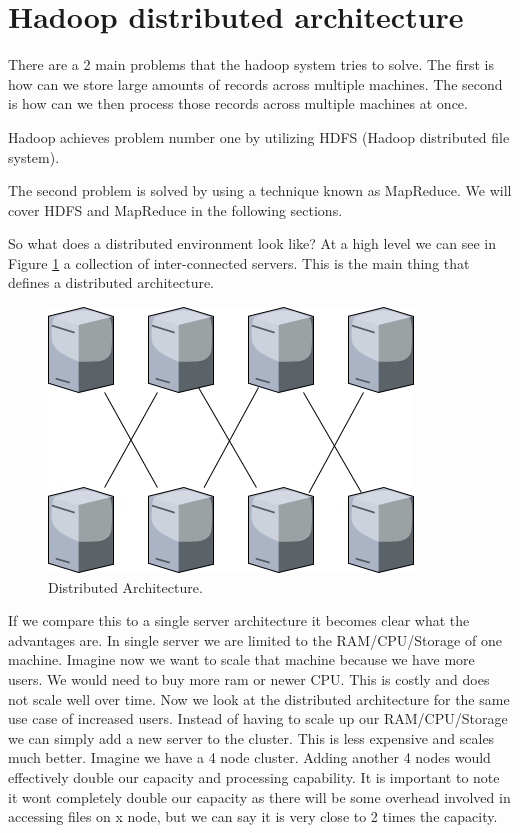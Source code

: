 \section{Hadoop distributed architecture}

There are a 2 main problems that the hadoop system tries to solve. 
The first is how can we store large amounts of records across multiple machines.
The second is how can we then process those records across multiple machines at once.

Hadoop achieves problem number one by utilizing HDFS (Hadoop distributed file system). 

The second problem is solved by using a technique known as MapReduce.
We will cover HDFS and MapReduce in the following sections. 

So what does a distributed environment look like? At a high level we can see in Figure \ref{fig:distributed} a collection of inter-connected servers. This is the main thing that defines a distributed architecture. 

\begin{figure}[h!]
  \includegraphics[width=\linewidth]{./images/distributed.png}
  \caption{Distributed Architecture.}
  \label{fig:distributed}
\end{figure}

If we compare this to a single server architecture it becomes clear what the advantages are. In single server we are limited to the RAM/CPU/Storage of one machine. Imagine now we want to scale that machine because we have more users. We would need to buy more ram or newer CPU. This is costly and does not scale well over time. Now we look at the distributed architecture for the same use case of increased users. Instead of having to scale up our RAM/CPU/Storage we can simply add a new server to the cluster. This is less expensive and scales much better. Imagine we have a 4 node cluster. Adding another 4 nodes would effectively double our capacity and processing capability. It is important to note it wont completely double our capacity as there will be some overhead involved in accessing files on x node, but we can say it is very close to 2 times the capacity.
